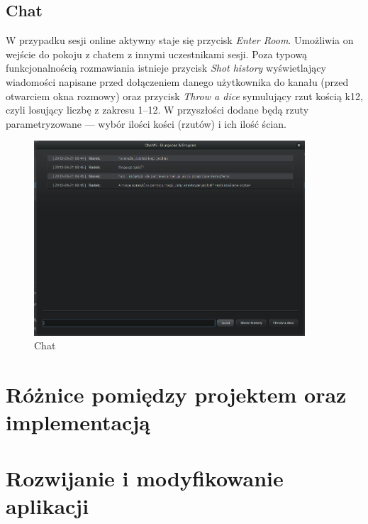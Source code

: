 \subsection{Chat}
\label{sec:chat}

W przypadku sesji online aktywny staje się przycisk \emph{Enter Room}. Umożliwia on wejście do pokoju z chatem z innymi uczestnikami sesji. Poza typową funkcjonalnością rozmawiania istnieje przycisk \emph{Shot history} wyświetlający wiadomości napisane przed dołączeniem danego użytkownika do kanału (przed otwarciem okna rozmowy) oraz przycisk \emph{Throw a dice} symulujący rzut kością k12, czyli losujący liczbę z zakresu 1--12. W przyszłości dodane będą rzuty parametryzowane --- wybór ilości kości (rzutów) i ich ilość ścian.

\begin{figure}[htb]	
\centering
\includegraphics[width=0.9\textwidth]{./img/interfejsy/chat}
\caption{Chat}
\label{fig:faq}
\end{figure}


\section{Różnice pomiędzy projektem oraz implementacją}
\label{sec:roznice}



\section{Rozwijanie i modyfikowanie aplikacji}
\label{sec:rozwoj}

